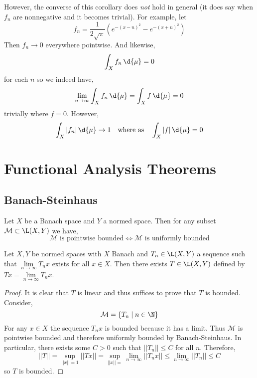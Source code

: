 \documentclass[12pt]{article}
\begin{document}
\begin{rmk}
However, the converse of this corollary does \textit{not} hold in general (it does say when $f_n$ are nonnegative and it becomes trivial). For example, let
\[ f_n = \frac{1}{2 \sqrt{\pi}} \left( e^{-(x - n)^2} - e^{-(x + n)^2}  \right) \]
Then $f_n \to 0$ everywhere pointwise. And likewise,
\[ \int_X f_n \, \d{\mu} = 0 \]
for each $n$ so we indeed have,
\[ \lim_{n \to \infty} \int_X f_n \, \d{\mu} = \int_X f \, \d{\mu} = 0 \]
trivially where $f = 0$. However,
\[ \int_X |f_n| \, \d{\mu} \to 1 \quad \text{where as} \quad \int_X |f| \, \d{\mu} = 0 \]
\end{rmk}

\section{Functional Analysis Theorems}

\subsection{Banach-Steinhaus}

\begin{theorem}
Let $X$ be a Banach space and $Y$ a normed space. Then for any subset $\mathcal{M} \subset \L(X, Y)$ we have,
\[ \mathcal{M} \text{ is pointwise bounded} \iff \mathcal{M} \text{ is uniformly bounded} \]
\end{theorem}

\begin{cor}
Let $X, Y$ be normed spaces with $X$ Banach and $T_n \in \L(X, Y)$ a sequence such that $\lim\limits_{n \to \infty} T_n x$ exists for all $x \in X$. Then there exists $T \in \L(X, Y)$ defined by $T x = \lim\limits_{n \to \infty} T_n x$.
\end{cor}

\begin{proof}
It is clear that $T$ is linear and thus suffices to prove that $T$ is bounded. Consider,
\[ \mathcal{M} = \{ T_n \mid n \in \N \} \]
For any $x \in X$ the sequence $T_n x$ is bounded because it has a limit. Thus $\mathcal{M}$ is pointwise bounded and therefore uniformly bounded by Banach-Steinhaus. In particular, there exists some $C > 0$ such that $|| T_n || \le C$ for all $n$. Therefore,
\[ || T || = \sup_{|| x || = 1} || T x || = \sup_{|| x || =  } \lim_{n \to \infty} || T_n x || \le \lim_{n \to \infty} || T_n || \le C \]
so $T$ is bounded.
\end{proof}
\end{document}
